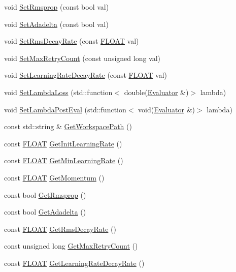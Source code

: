 \begin{DoxyCompactItemize}
\item 
void \hyperlink{classfractal_1_1AutoOptimizer_a952cb29558d31e51b5dd660a3feabea4}{Set\+Rmsprop} (const bool val)
\item 
void \hyperlink{classfractal_1_1AutoOptimizer_aa89f019725afed0d82ed44580ad67041}{Set\+Adadelta} (const bool val)
\item 
void \hyperlink{classfractal_1_1AutoOptimizer_a77cc8ed1ad995342a795dd0bfcfdbca9}{Set\+Rms\+Decay\+Rate} (const \hyperlink{namespacefractal_a1c2d2530689575d5ccb56bae52af70d3}{F\+L\+O\+A\+T} val)
\item 
void \hyperlink{classfractal_1_1AutoOptimizer_a952ed95e33579334a22ebad63cd5a3a1}{Set\+Max\+Retry\+Count} (const unsigned long val)
\item 
void \hyperlink{classfractal_1_1AutoOptimizer_a34def384fd138ba5b986ceac988d7cd2}{Set\+Learning\+Rate\+Decay\+Rate} (const \hyperlink{namespacefractal_a1c2d2530689575d5ccb56bae52af70d3}{F\+L\+O\+A\+T} val)
\item 
void \hyperlink{classfractal_1_1AutoOptimizer_ad8ff2b8b03172470c3f6e04e6c80e2e5}{Set\+Lambda\+Loss} (std\+::function$<$ double(\hyperlink{classfractal_1_1Evaluator}{Evaluator} \&)$>$ lambda)
\item 
void \hyperlink{classfractal_1_1AutoOptimizer_a599d01238939f6e6b7edc17a2c75837f}{Set\+Lambda\+Post\+Eval} (std\+::function$<$ void(\hyperlink{classfractal_1_1Evaluator}{Evaluator} \&)$>$ lambda)
\item 
const std\+::string \& \hyperlink{classfractal_1_1AutoOptimizer_a40ddbe471d220a99ff63b5f6e36d9f23}{Get\+Workspace\+Path} ()
\item 
const \hyperlink{namespacefractal_a1c2d2530689575d5ccb56bae52af70d3}{F\+L\+O\+A\+T} \hyperlink{classfractal_1_1AutoOptimizer_a615800e1d9f8a74e059c6cefd8ae34a7}{Get\+Init\+Learning\+Rate} ()
\item 
const \hyperlink{namespacefractal_a1c2d2530689575d5ccb56bae52af70d3}{F\+L\+O\+A\+T} \hyperlink{classfractal_1_1AutoOptimizer_a62c50420cc7a21afccfe6dd1851cea08}{Get\+Min\+Learning\+Rate} ()
\item 
const \hyperlink{namespacefractal_a1c2d2530689575d5ccb56bae52af70d3}{F\+L\+O\+A\+T} \hyperlink{classfractal_1_1AutoOptimizer_afbabc25af9b3e25a9d574ecb4fb21d8b}{Get\+Momentum} ()
\item 
const bool \hyperlink{classfractal_1_1AutoOptimizer_a267e331f05ab03a7342c8b335894780f}{Get\+Rmsprop} ()
\item 
const bool \hyperlink{classfractal_1_1AutoOptimizer_a3ea55a1c6bcefea20d73566c6daa274d}{Get\+Adadelta} ()
\item 
const \hyperlink{namespacefractal_a1c2d2530689575d5ccb56bae52af70d3}{F\+L\+O\+A\+T} \hyperlink{classfractal_1_1AutoOptimizer_af4698e9f1d10bb66983b228b6f420ff1}{Get\+Rms\+Decay\+Rate} ()
\item 
const unsigned long \hyperlink{classfractal_1_1AutoOptimizer_a54cd7b56cb4436b9a7cffc201d9b7c9b}{Get\+Max\+Retry\+Count} ()
\item 
const \hyperlink{namespacefractal_a1c2d2530689575d5ccb56bae52af70d3}{F\+L\+O\+A\+T} \hyperlink{classfractal_1_1AutoOptimizer_aaa5835c8a82b8b02ba5b81aa8af449c9}{Get\+Learning\+Rate\+Decay\+Rate} ()
\end{DoxyCompactItemize}
